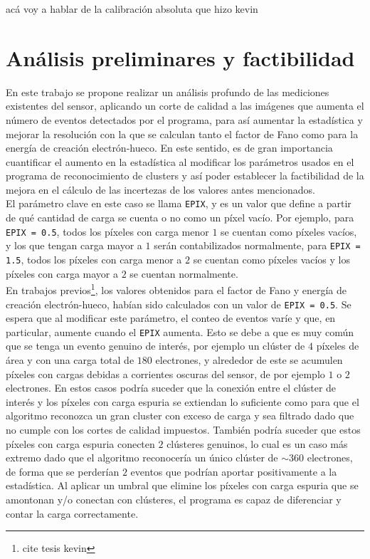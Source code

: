 acá voy a hablar de la calibración absoluta que hizo kevin




\chapter{Análisis preliminares y factibilidad}
\noindent En este trabajo se propone realizar un análisis profundo de las mediciones existentes del sensor, aplicando un corte de calidad a las imágenes que aumenta el número de eventos detectados por el programa, para así aumentar la estadística y mejorar la resolución con la que se calculan tanto el factor de Fano como para la energía de creación electrón-hueco. %
En este sentido, es de gran importancia cuantificar el aumento en la estadística al modificar los parámetros usados en el programa de reconocimiento de clusters y así poder establecer la factibilidad de la mejora en el cálculo de las incertezas de los valores antes mencionados.\\
\indent El parámetro clave en este caso se llama \verb|EPIX|, y es un valor que define a partir de qué cantidad de carga se cuenta o no como un píxel vacío. Por ejemplo, para \verb|EPIX = 0.5|, todos los píxeles con carga menor $1$ se cuentan como píxeles vacíos, y los que tengan carga mayor a $1$ serán contabilizados normalmente, para \verb|EPIX = 1.5|, todos los píxeles con carga menor a $2$ se cuentan como píxeles vacíos y los píxeles con carga mayor a $2$ se cuentan normalmente.\\
\indent En trabajos previos\footnote{cite tesis kevin}, los valores obtenidos para el factor de Fano y energía de creación electrón-hueco, habían sido calculados con un valor de \verb|EPIX = 0.5|. Se espera que al modificar este parámetro, el conteo de eventos varíe y que, en particular, aumente cuando el \verb|EPIX| aumenta. Esto se debe a que es muy común que se tenga un evento genuino de interés, por ejemplo un clúster de $4$ píxeles de área y con una carga total de $180$ electrones, y alrededor de este se acumulen píxeles con cargas debidas a corrientes oscuras del sensor, de por ejemplo $1$ o $2$ electrones. En estos casos podría suceder que la conexión entre el clúster de interés y los píxeles con carga espuria se extiendan lo suficiente como para que el algoritmo reconozca un gran cluster con exceso de carga y sea filtrado dado que no cumple con los cortes de calidad impuestos. También podría suceder que estos píxeles con carga espuria conecten $2$ clústeres genuinos, lo cual es un caso más extremo dado que el algoritmo reconocería un único clúster de $\sim 360$ electrones, de forma que se perderían $2$ eventos que podrían aportar positivamente a la estadística. Al aplicar un umbral que elimine los píxeles con carga espuria que se amontonan y/o conectan con clústeres, el programa es capaz de diferenciar y contar la carga correctamente.\\
